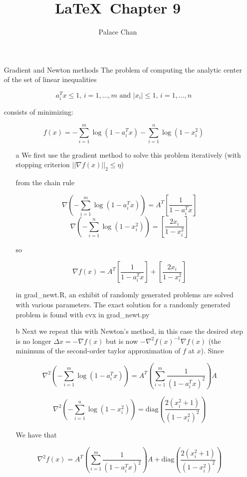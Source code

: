 \documentclass[12pt]{article}
\title{\LaTeX\ Chapter 9}
\author{Palace Chan}
\begin{document}
\maketitle
\newpage

\begin{itemize}

\item[Gradient and Newton methods]
  The problem of computing the analytic center of the set of linear inequalities

  $$a_i^T x \leq 1 \text{,    } i = 1,\ldots,m \text{  and  } |x_i| \leq 1 \text{,    } i = 1,\ldots,n$$

  consists of minimizing:

  $$f(x) = - \sum_{i=1}^m \log (1 - a_i^T x) - \sum_{i=1}^n \log (1 - x_i^2)$$

  \begin{itemize}
  \item[a]
    We first use the gradient method to solve this problem iteratively (with stopping criterion $|| \nabla f(x) ||_2 \leq \eta$)

    from the chain rule
    
    $$\nabla \left(-\sum_{i=1}^m \log (1 - a_i^T x)\right) = A^T \left[ \frac{1}{1-a_i^T x} \right]$$
    $$\nabla \left(-\sum_{i=1}^n \log (1 - x_i^2)\right) = \left[ \frac{2 x_i}{1 - x_i^2} \right]$$

    so

    $$\nabla f(x) = A^T \left[ \frac{1}{1-a_i^T x} \right] + \left[ \frac{2 x_i}{1 - x_i^2} \right]$$

    in grad_newt.R, an exhibit of randomly generated problems are solved with various parameters.
    The exact solution for a randomly generated problem is found with cvx in grad_newt.py

  \item[b]
    Next we repeat this with Newton's method, in this case the desired step is no longer $\Delta x = - \nabla f(x)$ but is now $-\nabla^2 f(x)^{-1} \nabla f(x)$ (the minimum of the second-order taylor approximation of $f$ at $x$). Since

    $$\nabla^2 \left(-\sum_{i=1}^m \log (1 - a_i^T x)\right) = A^T \left( \sum_{i=1}^m \frac{1}{(1-a_i^Tx)^2} \right) A$$

    $$\nabla^2 \left(-\sum_{i=1}^n \log (1 - x_i^2)\right) = \text{diag} \left( \frac{2 (x_i^2 + 1)}{(1 - x_i^2)^2} \right)$$

    We have that

    $$\nabla^2 f(x) = A^T \left( \sum_{i=1}^m \frac{1}{(1-a_i^Tx)^2} \right) A + \text{diag} \left( \frac{2 (x_i^2 + 1)}{(1 - x_i^2)^2} \right)$$


\end{itemize}
\end{itemize}
\end{document}
